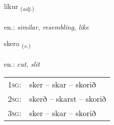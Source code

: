 \documentclass[frontgrid, backgrid]{flacards}\usepackage[]{graphicx}\usepackage[]{xcolor}
\begin{document}
\renewcommand{\flhead}{\vskip5pt \fboxsep=0pt {\small\bfseries\footnotesize Lýsingarorð | Adjective}}
\renewcommand{\fcfoot}{\vskip5pt \fboxsep=0pt \hspace{2pt}{\small\bfseries\footnotesize 1K}}

\renewcommand{\blhead}{\vskip5pt {\small\bfseries\footnotesize Lýsingarorð | Adjective }}
\renewcommand{\bcfoot}{\vskip5pt \hspace{2pt}{\small\bfseries\footnotesize 1K}}


{líkur \small{\textsubscript{(\textit{adj.})}} \\[1ex] %
\textphonetic{[liːkʏr]} \\
en.: \emph{similar, resembling, like} \\  [2ex]
\renewcommand*{\arraystretch}{0.8}
}

\renewcommand{\flhead}{\vskip5pt \fboxsep=0pt {\small\bfseries\footnotesize Sagnorð | Verb}}
\renewcommand{\fcfoot}{\vskip5pt \fboxsep=0pt \hspace{2pt}{\small\bfseries\footnotesize 1K}}

\renewcommand{\blhead}{\vskip5pt {\small\bfseries\footnotesize Sagnorð | Verb }}
\renewcommand{\bcfoot}{\vskip5pt \hspace{2pt}{\small\bfseries\footnotesize 1K}}


{skera \small{\textsubscript{(\textit{v.})}} \\[1ex] %
\textphonetic{[scɛːra]} \\
en.: \emph{cut, slit} \\  [2ex]
\renewcommand*{\arraystretch}{0.8}
\begin{tabular}{p{1cm}l}
\textsc{1sg}: & sker -- skar -- skorið \\ 
\textsc{2sg}: & skerð -- skarst -- skorið \\ 
\textsc{3sg}: & sker -- skar -- skorið \\ 
\end{tabular}
}
\end{document}
